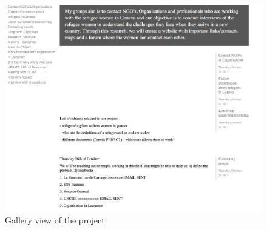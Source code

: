 \begin{figure}[H]
	\centering
	\includegraphics[scale=.3]{./images/img-refugeeintegrationblogmode.png}
	\caption{Gallery view of the project} 
	\label{img-viewgallerymode3}
\end{figure}



